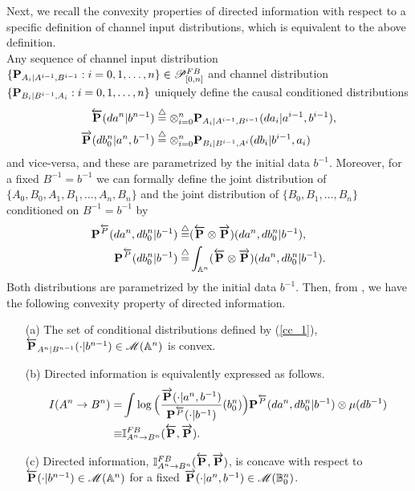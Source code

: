 \documentclass[11pt, a4paper, journal,onecolumn]{IEEEtran}
\newcommand{\mb}{\mathbb}
\newcommand{\sr}{\stackrel}
\newcommand{\rar}{\rightarrow}
\newcommand{\tri}{\sr{\triangle}{=}}
\begin{document}
Next, we recall the convexity properties of directed information with respect to a specific definition of channel input distributions, which is equivalent to the above definition. \\
Any sequence of channel input distribution $\{{ \bf P}_{A_i|A^{i-1}, B^{i-1}}: i=0,1, \ldots, n\} \in {\cal P}_{[0,n]}^{FB}$ and channel distribution $\{{\bf P}_{B_i|B^{i-1}, A_i}: i=0,1, \ldots, n\}$
 uniquely define the causal conditioned distributions 
\begin{align}
{\overleftarrow {\bf P}}(da^n|b^{n-1}) &\tri \otimes_{i=0}^n {\bf P}_{A_i|A^{i-1}, B^{i-1}}(da_i|a^{i-1}, b^{i-1}), \label{cc_1} \\
 \overrightarrow{ {\bf P}}(db_0^n|a^n,b^{-1}) &\tri \otimes_{i=0}^n {\bf P}_{B_i|B^{i-1}, A^{i}}(db_i|b^{i-1}, a_{i})  \label{cc_2}
\end{align} 
and vice-versa, and these are parametrized by the initial data $b^{-1}$. Moreover, for a fixed $B^{-1}=b^{-1}$ we can formally define the joint distribution of $\{A_0, B_0, A_1, B_1, \ldots, A_n, B_n\}$   and the joint distribution of $\{B_0, B_1, \ldots, B_n\}$ conditioned on $B^{-1}=b^{-1}$ by   
\begin{align}
{\bf P}^{\overleftarrow{P}}(da^n,db_0^n|b^{-1})\tri & (\overleftarrow{ \bf P}\otimes \overrightarrow{\bf P})( da^n, db_0^n|b^{-1}), \\
{\bf P}^{\overleftarrow{P}}(db_0^n|b^{-1})\tri& \int_{\mb A^n} (\overleftarrow{ \bf P}\otimes \overrightarrow{\bf P})( da^n, db_0^n|b^{-1}).
\end{align}
Both distributions are parametrized by the initial data $b^{-1}$. Then, from \cite{charalambous-stavrou2012}, we have the following convexity property of  directed information.
\begin{itemize}
\item[(a)] The set of conditional distributions defined by (\ref{cc_1}), ${\overleftarrow {\bf P}}_{A^n|B^{n-1}}(\cdot|b^{n-1})\in {\cal M}({\mathbb A}^n)$ is convex.
\item[(b)] Directed information is equivalently expressed as follows.
\begin{align}
I(A^n\rightarrow B^n) =& \int   \log \Big( \frac{ \overrightarrow{\bf P}(\cdot|a^n,b^{-1})}{{\bf P}^{\overleftarrow{P}}(\cdot|b^{-1})}(b_0^n)\Big){\bf P}^{\overleftarrow{P}}( da^n, db_0^n|b^{-1})\otimes \mu(db^{-1})
\nonumber \\
\equiv & {\mathbb I}_{A^n \rar B^n}^{FB}(\overleftarrow{\bf P}, \overrightarrow{ \bf P}) .       \label{eqdi5}
\end{align}
\item[(c)] Directed information, ${\mathbb I}_{A^n \rar B^n}^{FB}(\overleftarrow{\bf P}, \overrightarrow{ \bf P})$, is concave with respect to ${\overleftarrow {\bf P}}(\cdot|b^{n-1})\in {\cal M}({\mathbb A}^n)$ for a fixed $\overrightarrow{\bf  P}(\cdot|a^n,b^{-1}) \in {\cal M}({\mathbb B}_{0}^n)$. 
\end{itemize}
\end{document}
